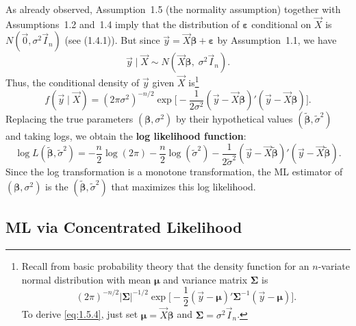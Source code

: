 As already observed, Assumption~1.5 (the normality assumption) together with
Assumptions~1.2 and~1.4 imply that the distribution of $\bm{\varepsilon}$ conditional on
$\vec{X}$ is $N(\vec{0}, \sigma^2 \vec{I}_n)$ (see (1.4.1)).  But since
$\vec{y} = \vec{X}\bm{\beta} + \bm{\varepsilon}$ by Assumption~1.1, we have
%
\begin{equation}
  \vec{y} \mid \vec{X} \sim N(\vec{X}\bm{\beta},\; \sigma^2 \vec{I}_n).
  \label{eq:1.5.3}
\end{equation}
%
Thus, the conditional density of $\vec{y}$ given $\vec{X}$
is\footnote{Recall from basic probability theory that the density function for an
$n$-variate normal distribution with mean $\bm{\mu}$ and variance matrix $\bm{\Sigma}$ is
\[
  (2\pi)^{-n/2} \lvert \bm{\Sigma} \rvert^{-1/2}
  \exp\!\biggl[-\frac{1}{2}(\vec{y} - \bm{\mu})' \bm{\Sigma}^{-1}
  (\vec{y} - \bm{\mu})\biggr].
\]
To derive \eqref{eq:1.5.4}, just set $\bm{\mu} = \vec{X}\bm{\beta}$ and
$\bm{\Sigma} = \sigma^2 \vec{I}_n$.}
%
\begin{equation}
  f(\vec{y} \mid \vec{X})
    = (2\pi\sigma^2)^{-n/2}
      \exp\!\biggl[-\frac{1}{2\sigma^2}
      (\vec{y} - \vec{X}\bm{\beta})'(\vec{y} - \vec{X}\bm{\beta})\biggr].
  \label{eq:1.5.4}
\end{equation}
%
Replacing the true parameters $(\bm{\beta}, \sigma^2)$ by their hypothetical values
$(\widetilde{\bm{\beta}}, \tilde{\sigma}^2)$ and taking logs, we obtain the
\textbf{log likelihood function}:
%
\begin{equation}
  \log L(\widetilde{\bm{\beta}}, \tilde{\sigma}^2)
    = -\frac{n}{2}\log(2\pi)
      - \frac{n}{2}\log(\tilde{\sigma}^2)
      - \frac{1}{2\tilde{\sigma}^2}
        (\vec{y} - \vec{X}\widetilde{\bm{\beta}})'
        (\vec{y} - \vec{X}\widetilde{\bm{\beta}}).
  \label{eq:1.5.5}
\end{equation}
%
Since the log transformation is a monotone transformation, the ML estimator of
$(\bm{\beta}, \sigma^2)$ is the $(\widetilde{\bm{\beta}}, \tilde{\sigma}^2)$ that maximizes
this log likelihood.

\subsection*{ML via Concentrated Likelihood}

